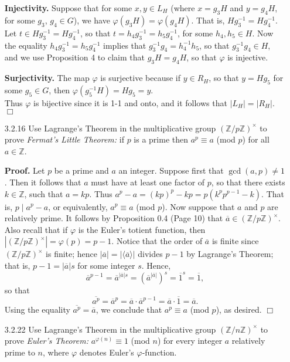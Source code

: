 \documentclass[9pt]{article}
\newcommand{\qed}{\hfill \ensuremath{\Box}}
\newcommand{\cyc}[1]{\langle #1 \rangle}
\newcommand{\Z}{\mathbb{Z}}
\begin{document}
\begin{enumerate}
      \textbf{Injectivity.} Suppose that for some $x, y \in L_H$ (where
      $x = g_3H$ and $y = g_4H$, for some $g_3$, $g_4 \in G$), we have
      $\varphi(g_3H) = \varphi(g_4H)$. That is, $Hg_3^{-1} = Hg_4^{-1}$. Let
      $t \in Hg_3^{-1} = Hg_4^{-1}$, so that $t = h_4g_3^{-1} = h_5g_4^{-1}$,
      for some $h_4, h_5 \in H$. Now the equality $h_4g_3^{-1} = h_5g_4^{-1}$
      implies that $g_3^{-1}g_4 = h_4^{-1}h_5$, so that $g_3^{-1}g_4 \in H$, and
      we use Proposition 4 to claim that $g_3H = g_4H$, so that $\varphi$ is
      injective.
      
      \textbf{Surjectivity.} The map $\varphi$ is surjective because if
      $y \in R_H$, so that $y = Hg_5$ for some $g_5 \in G$, then
      $\varphi(g_5^{-1}H) = Hg_5 = y$. \\
      
      Thus $\varphi$ is bijective since it is 1-1 and onto, and it follows that
      $|L_H| = |R_H|$. \qed
   \item[3.2.16]  Use Lagrange's Theorem in the multiplicative group
                  $(\Z/p\Z)^\times$ to prove \textit{Fermat's Little Theorem: }
                  if $p$ is a prime then $a^p \equiv a$ (mod $p$) for all
                  $a \in \Z$.

      \textbf{Proof.} Let $p$ be a prime and $a$ an integer. Suppose first that
      $\gcd(a, p) \neq 1$. Then it follows that $a$ must have at least one
      factor of $p$, so that there exists $k \in \Z$, such that $a = kp$. Thus
      $a^p - a = (kp)^p - kp = p(k^pp^{p-1} - k)$. That is, $p \mid a^p - a$,
      or equivalently, $a^p \equiv a$ (mod $p$). Now suppose that $a$ and $p$
      are relatively prime. It follows by Proposition 0.4 (Page 10) that
      $\overline{a} \in (\Z/p\Z)^\times$. Also recall that if $\varphi$ is the
      Euler's totient function, then $|(\Z/p\Z)^\times| = \varphi(p) = p - 1$.
      Notice that the order of $\overline{a}$ is finite since $(\Z/p\Z)^\times$ 
      is finite; hence $|\overline{a}| = |\cyc{\overline{a}}|$ divides
      $p - 1$ by Lagrange's Theorem; that is, $p - 1 = |\overline{a}|s$ for some 
      integer $s$. Hence,
      $$\overline{a}^{p-1} = \overline{a}^{|\overline{a}|s} =
        (\overline{a}^{|\overline{a}|})^s = \overline{1}^s = \overline{1},$$
      so that
      $$\overline{a^p} = \overline{a}^p = \overline{a}\cdot
        \overline{a}^{p-1} = \overline{a} \cdot \overline{1} = \overline{a}.$$
      Using the equality $\overline{a^p} = \overline{a}$, we conclude that
      $a^p \equiv a$ (mod $p$), as desired. \qed
   \item[3.2.22]  Use Lagrange's Theorem in the multiplicative group
                  $(\Z/n\Z)^\times$ to prove \textit{Euler's Theorem: }
                  $a^{\varphi(n)} \equiv 1$ (mod $n$) for every integer $a$
                  relatively prime to $n$, where $\varphi$ denotes Euler's
                  $\varphi$-function.


\end{enumerate}
\end{document}
